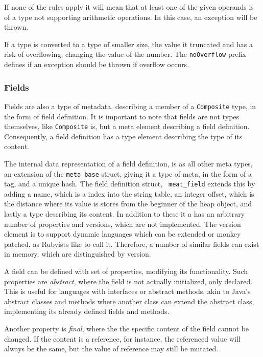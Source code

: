 If none of the rules apply it will mean that at least one of the given operands
is of a type not supporting arithmetic operations. In this case, an exception
will be thrown.

If a type is converted to a type of smaller size, the value it truncated and has
a risk of overflowing, changing the value of the number. The {\tt noOverflow}
prefix defines if an exception should be thrown if overflow occurs.

\subsubsection{Fields}
\label{sec:implementation:meta:fields}

Fields are also a type of metadata, describing a member of a {\tt Composite}
type, in the form of field definition. It is important to note that fields are
not types themselves, like {\tt Composite} is, but a meta element describing a
field definition. Consequently, a field definition has a type element describing
the type of its content.

The internal data representation of a field definition, is as all other meta
types, an extension of the {\tt meta\_base} struct, giving it a type of meta, in
the form of a tag, and a unique hash. The field definition struct, {\tt
  meat\_field} extends this by adding a name, which is a index into the string
table, an integer offset, which is the distance where its value is stores from
the beginner of the heap object, and lastly a type describing its content. In
addition to these it a has an arbitrary number of properties and versions, which
are not implemented. The version element is to support dynamic languages
which can be extended or monkey patched, as Rubyists like to call it. Therefore,
a number of similar fields can exist in memory, which are distinguished by
version. %

A field can be defined with set of properties, modifying its functionality. Such
properties are {\em abstract}, where the field is not actually initialized, only
declared. This is useful for languages with interfaces or abstract methods, akin
to Java's abstract classes and methods where another class can extend the
abstract class, implementing its already defined fields and methods.

Another property is {\em final}, where the the specific content of the field
cannot be changed. If the content is a reference, for instance, the referenced
value will always be the same, but the value of reference may still be mutated.

